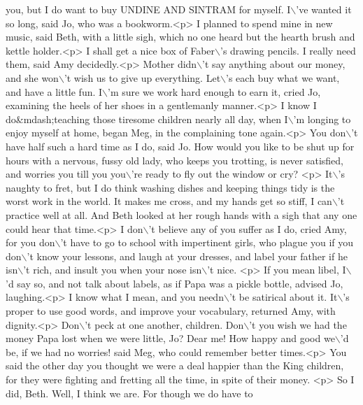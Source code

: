 \begin{DoxyCode}
{       you, but I do want to buy UNDINE AND SINTRAM for myself. I\(\backslash\)'ve wanted it so long,  said Jo, who was a
       bookworm.<p> I planned to spend mine in new music,  said Beth, with a little sigh, which no one heard but the
       hearth brush and kettle holder.<p> I shall get a nice box of Faber\(\backslash\)'s drawing pencils. I really need them,  said
       Amy decidedly.<p> Mother didn\(\backslash\)'t say anything about our money, and she won\(\backslash\)'t wish us to give up everything.
       Let\(\backslash\)'s each buy what we want, and have a little fun. I\(\backslash\)'m sure we work hard enough to earn it,  cried Jo,
       examining the heels of her shoes in a gentlemanly manner.<p> I know I do&mdash;teaching those tiresome
       children nearly all day, when I\(\backslash\)'m longing to enjoy myself at home,  began Meg, in the complaining tone again.<p>
       You don\(\backslash\)'t have half such a hard time as I do,  said Jo.  How would you like to be shut up for hours with a
       nervous, fussy old lady, who keeps you trotting, is never satisfied, and worries you till you you\(\backslash\)'re ready
       to fly out the window or cry? <p> It\(\backslash\)'s naughty to fret, but I do think washing dishes and keeping things
       tidy is the worst work in the world.  It makes me cross, and my hands get so stiff, I can\(\backslash\)'t practice well at
       all.  And Beth looked at her rough hands with a sigh that any one could hear that time.<p> I don\(\backslash\)'t believe
       any of you suffer as I do,  cried Amy,  for you don\(\backslash\)'t have to go to school with impertinent girls, who
       plague you if you don\(\backslash\)'t know your lessons, and laugh at your dresses, and label your father if he isn\(\backslash\)'t rich,
       and insult you when your nose isn\(\backslash\)'t nice. <p> If you mean libel, I\(\backslash\)'d say so, and not talk about labels, as
       if Papa was a pickle bottle,  advised Jo, laughing.<p> I know what I mean, and you needn\(\backslash\)'t be satirical
       about it. It\(\backslash\)'s proper to use good words, and improve your vocabulary,  returned Amy, with dignity.<p> Don\(\backslash\)'t
       peck at one another, children. Don\(\backslash\)'t you wish we had the money Papa lost when we were little, Jo? Dear me!
       How happy and good we\(\backslash\)'d be, if we had no worries!  said Meg, who could remember better times.<p> You said
       the other day you thought we were a deal happier than the King children, for they were fighting and fretting
       all the time, in spite of their money. <p> So I did, Beth. Well, I think we are. For though we do have to
}
\end{DoxyCode}
